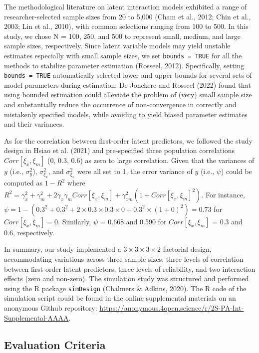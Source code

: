 \documentclass[
  man]{apa6}
\begin{document}
The methodological literature on latent interaction models exhibited a range of researcher-selected sample sizes from 20 to 5,000 (Cham et al., 2012; Chin et al., 2003; Lin et al., 2010), with common selections ranging from 100 to 500. In this study, we chose N = 100, 250, and 500 to represent small, medium, and large sample sizes, respectively. Since latent variable models may yield unstable estimates especially with small sample sizes, we set \texttt{bounds\ =\ TRUE} for all the methods to stabilize parameter estimation (Rosseel, 2012). Specifically, setting \texttt{bounds\ =\ TRUE} automatically selected lower and upper bounds for several sets of model parameters during estimation. De Jonckere and Rosseel (2022) found that using bounded estimation could alleviate the problem of (very) small sample size and substantially reduce the occurrence of non-convergence in correctly and mistakenly specified models, while avoiding to yield biased parameter estimates and their variances.

As for the correlation between first-order latent predictors, we followed the study design in Hsiao et al. (2021) and pre-specified three population correlations \(Corr[{\xi_{x},\xi_{m}}]\) (0, 0.3, 0.6) as zero to large correlation. Given that the variances of \(y\) (i.e., \(\sigma_{y}^2\)), \(\sigma_{\xi_{x}}^2\), and \(\sigma_{\xi_{x}}^2\) were all set to 1, the error variance of \(y\) (i.e., \(\psi\)) could be computed as \(1 - R^2\) where \(R^2 = \gamma_{x}^2 + \gamma_{m}^2 + 2\gamma_{x}\gamma_{m}Corr[{\xi_{x},\xi_{m}}] + \gamma_{xm}^2(1 + Corr[{\xi_{x},\xi_{m}}]^2)\). For instance, \(\psi = 1 - (0.3^2 + 0.3^2 + 2\times0.3\times0.3\times0 + 0.3^2\times(1 + 0)^2) = 0.73\) for \(Corr[{\xi_{x},\xi_{m}}] = 0\). Similarly, \(\psi\) = 0.668 and 0.590 for \(Corr[{\xi_{x},\xi_{m}}]\) = 0.3 and 0.6, respectively.

In summary, our study implemented a \(3 \times 3 \times 3 \times 2\) factorial design, accommodating variations across three sample sizes, three levels of correlation between first-order latent predictors, three levels of reliability, and two interaction effects (zero and non-zero). The simulation study was structured and performed using the R package \texttt{simDesign} (Chalmers \& Adkins, 2020). The R code of the simulation script could be found in the online supplemental materials on an anonymous Github repository: \url{https://anonymous.4open.science/r/2S-PA-Int-Supplemental-AAAA}.

\subsection{Evaluation Criteria}\label{evaluation-criteria}
\end{document}
